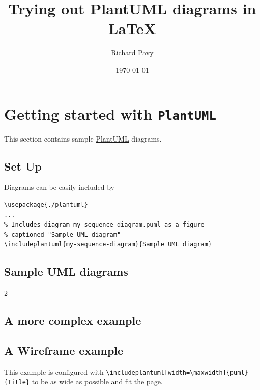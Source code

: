 \documentclass[11pt,parskip=half]{scrartcl}
\title{Trying out PlantUML diagrams in \LaTeX}
\author{Richard Pavy}
\date{\today}
\begin{document}
\maketitle

\tableofcontents
\listoffigures
\listoflistings

\section{Getting started with \texttt{PlantUML}}

This section contains sample \href{https://plantuml.com}{PlantUML} diagrams.

\subsection{Set Up}

Diagrams can be easily included by

\begin{verbatim}
\usepackage{./plantuml}
...
% Includes diagram my-sequence-diagram.puml as a figure
% captioned "Sample UML diagram"
\includeplantuml{my-sequence-diagram}{Sample UML diagram}
\end{verbatim}

\subsection{Sample UML diagrams}

\begin{multicols}{2}
\end{multicols}

\subsection{A more complex example}


\subsection{A Wireframe example}

This example is configured with
\verb|\includeplantuml[width=\maxwidth]{puml}{Title}| to be as wide as possible
and fit the page.
\end{document}
